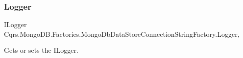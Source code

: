 \subsubsection{\texorpdfstring{Logger}{Logger}}
{\footnotesize\ttfamily I\+Logger Cqrs.\+Mongo\+D\+B.\+Factories.\+Mongo\+Db\+Data\+Store\+Connection\+String\+Factory.\+Logger\hspace{0.3cm}{\ttfamily [get]}, {\ttfamily [protected]}}



Gets or sets the I\+Logger. 

